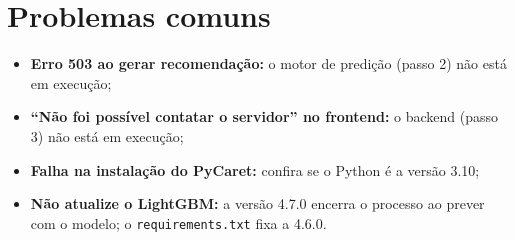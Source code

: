 \documentclass[12pt,a4paper]{article}
\begin{document}
\section{Problemas comuns}

\begin{itemize}[noitemsep]
  \item \textbf{Erro 503 ao gerar recomendação:} o motor de predição (passo 2) não está em execução;
  \item \textbf{``Não foi possível contatar o servidor'' no frontend:} o backend (passo 3) não está em execução;
  \item \textbf{Falha na instalação do PyCaret:} confira se o Python é a versão 3.10;
  \item \textbf{Não atualize o LightGBM:} a versão 4.7.0 encerra o processo ao prever com o modelo; o \texttt{requirements.txt} fixa a 4.6.0.
\end{itemize}
\end{document}
